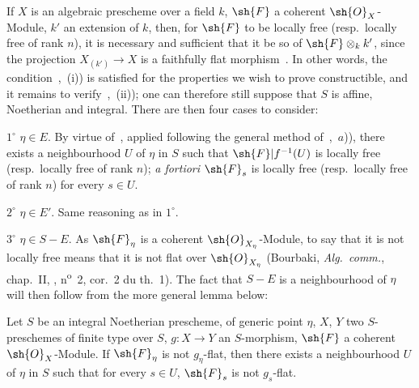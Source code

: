 If $X$ is an algebraic prescheme over a field $k$, $\sh{F}$ a coherent $\sh{O}_X$-Module, $k'$ an extension of $k$, then, for $\sh{F}$ to be locally free (resp.\ locally free of rank $n$), it is necessary and sufficient that it be so of $\sh{F}\otimes_k k'$, since the projection $X_{(k')}\to X$ is a faithfully flat morphism~.
In other words, the condition~,~(i)) is satisfied for the properties we wish to prove constructible, and it remains to verify~,~(ii)); one can therefore still suppose that $S$ is affine, Noetherian and integral.
There are then four cases to consider:

$1^\circ$ $\eta\in E$.
By virtue of~, applied following the general method of~,~$a$)), there exists a neighbourhood $U$ of $\eta$ in $S$ such that $\sh{F}|f^{-1}(U)$ is locally free (resp.\ locally free of rank $n$); \emph{a fortiori} $\sh{F}_s$ is locally free (resp.\ locally free of rank $n$) for every $s\in U$.

$2^\circ$ $\eta\in E'$.
Same reasoning as in $1^\circ$.

$3^\circ$ $\eta\in S-E$.
As $\sh{F}_\eta$ is a coherent $\sh{O}_{X_\eta}$-Module, to say that it is not locally free means that it is not flat over $\sh{O}_{X_\eta}$ (Bourbaki, \emph{Alg.\ comm.}, chap.~II, , n\textsuperscript{o}~2, cor.~2 du th.~1).
The fact that $S-E$ is a neighbourhood of $\eta$ will then follow from the more general lemma below:

\begin{lemma}[9.4.7.1]
\label{IV.9.4.7.1}
Let $S$ be an integral Noetherian prescheme, of generic point $\eta$, $X$, $Y$ two $S$-preschemes of finite type over $S$, $g:X\to Y$ an $S$-morphism, $\sh{F}$ a coherent $\sh{O}_X$-Module.
If $\sh{F}_\eta$ is not $g_\eta$-flat, then there exists a neighbourhood $U$ of $\eta$ in $S$ such that for every $s\in U$, $\sh{F}_s$ is not $g_s$-flat.
\end{lemma}

